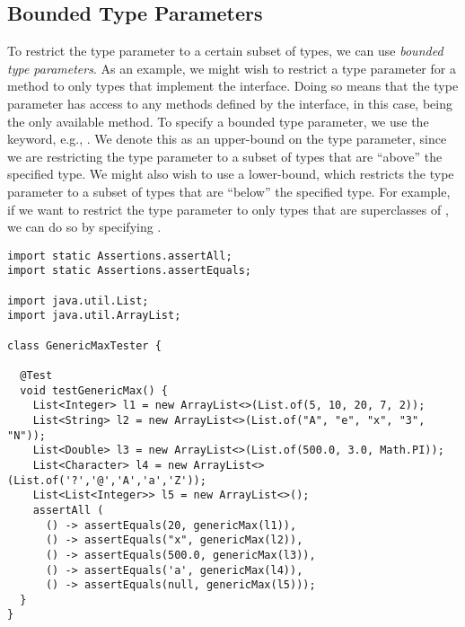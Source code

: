 \subsection{Bounded Type Parameters}
To restrict the type parameter to a certain subset of types, we can use \emph{bounded type parameters}. As an example, we might wish to restrict a type parameter for a method to only types that implement the  interface. Doing so means that the type parameter has access to any methods defined by the interface, in this case,  being the only available method. To specify a bounded type parameter, we use the  keyword, e.g., . We denote this as an upper-bound on the type parameter, since we are restricting the type parameter to a subset of types that are ``above'' the specified type. We might also wish to use a lower-bound, which restricts the type parameter to a subset of types that are ``below'' the specified type. For example, if we want to restrict the type parameter to only types that are superclasses of , we can do so by specifying .


\begin{lstlisting}[language=MyJava]
import static Assertions.assertAll;
import static Assertions.assertEquals;

import java.util.List;
import java.util.ArrayList;

class GenericMaxTester {
  
  @Test 
  void testGenericMax() {
    List<Integer> l1 = new ArrayList<>(List.of(5, 10, 20, 7, 2));
    List<String> l2 = new ArrayList<>(List.of("A", "e", "x", "3", "N"));
    List<Double> l3 = new ArrayList<>(List.of(500.0, 3.0, Math.PI));
    List<Character> l4 = new ArrayList<>(List.of('?','@','A','a','Z'));
    List<List<Integer>> l5 = new ArrayList<>();
    assertAll (
      () -> assertEquals(20, genericMax(l1)),
      () -> assertEquals("x", genericMax(l2)),
      () -> assertEquals(500.0, genericMax(l3)),
      () -> assertEquals('a', genericMax(l4)),
      () -> assertEquals(null, genericMax(l5)));
  }
}
\end{lstlisting}

